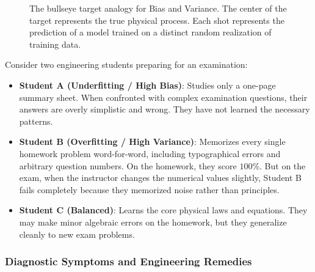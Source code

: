 \begin{figure}[htbp]
\caption{The bullseye target analogy for Bias and Variance. The center of the target represents the true physical process. Each shot represents the prediction of a model trained on a distinct random realization of training data.}\label{fig:bullseye_analogy}
\end{figure}

\begin{analogy}
Consider two engineering students preparing for an examination:
\begin{itemize}
    \item \textbf{Student A (Underfitting / High Bias)}: Studies only a one-page summary sheet. When confronted with complex examination questions, their answers are overly simplistic and wrong. They have not learned the necessary patterns.
    \item \textbf{Student B (Overfitting / High Variance)}: Memorizes every single homework problem word-for-word, including typographical errors and arbitrary question numbers. On the homework, they score $100\%$. But on the exam, when the instructor changes the numerical values slightly, Student B fails completely because they memorized noise rather than principles.
    \item \textbf{Student C (Balanced)}: Learns the core physical laws and equations. They may make minor algebraic errors on the homework, but they generalize cleanly to new exam problems.
\end{itemize}
\end{analogy}

\subsubsection{Diagnostic Symptoms and Engineering Remedies}

